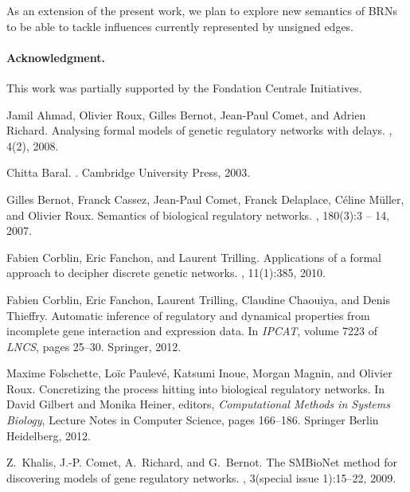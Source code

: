 \documentclass[11pt,a4paper,twoside]{epig}
\newcounter{la}
\begin{document}
As an extension of the present work, we plan to explore new semantics of BRNs to be able to tackle influences currently represented by unsigned edges.

\paragraph{Acknowledgment.}
This work was partially supported by the Fondation Centrale Initiatives.



\begin{thebibliography}{10}

Jamil Ahmad, Olivier Roux, Gilles Bernot, Jean-Paul Comet, and Adrien Richard.
\newblock Analysing formal models of genetic regulatory networks with delays.
, 4(2), 2008.

Chitta Baral.
.
\newblock Cambridge University Press, 2003.

Gilles Bernot, Franck Cassez, Jean-Paul Comet, Franck Delaplace, C{\'e}line
  M{\"u}ller, and Olivier Roux.
\newblock Semantics of biological regulatory networks.
, 180(3):3 --
  14, 2007.

Fabien Corblin, Eric Fanchon, and Laurent Trilling.
\newblock Applications of a formal approach to decipher discrete genetic
  networks.
, 11(1):385, 2010.

Fabien Corblin, Eric Fanchon, Laurent Trilling, Claudine Chaouiya, and Denis
  Thieffry.
\newblock Automatic inference of regulatory and dynamical properties from
  incomplete gene interaction and expression data.
\newblock In {\em IPCAT}, volume 7223 of {\em LNCS}, pages 25--30. Springer,
  2012.

Maxime Folschette, Loïc Paulevé, Katsumi Inoue, Morgan Magnin, and Olivier
  Roux.
\newblock Concretizing the process hitting into biological regulatory networks.
\newblock In David Gilbert and Monika Heiner, editors, {\em Computational
  Methods in Systems Biology}, Lecture Notes in Computer Science, pages
  166--186. Springer Berlin Heidelberg, 2012.

Z.~Khalis, J.-P. Comet, A.~Richard, and G.~Bernot.
\newblock The {SMBioNet} method for discovering models of gene regulatory
  networks.
, 3(special issue 1):15--22, 2009.


\end{thebibliography}
\end{document}
